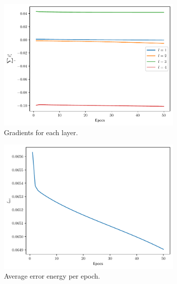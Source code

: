 \documentclass[conference]{IEEEtran}
\theoremstyle{definition}
\theoremstyle{remark}
\theoremstyle{remark}
\begin{document}
\begin{figure}
    \centering
    \begin{subfigure}[b]{0.32\textwidth}
        \centering
        \includegraphics[width=\textwidth]{figs/2-3-3-0.9-emb-gradients.pdf}
        \caption{Gradients for each layer.}
    \end{subfigure}
    \begin{subfigure}[b]{0.32\textwidth}
        \centering
        \includegraphics[width=\textwidth]{figs/2-3-3-0.9-emb-error.pdf}
        \caption{Average error energy per epoch.}
    \end{subfigure}
    \begin{subfigure}[b]{0.32\textwidth}
        \centering

\end{subfigure}
\end{figure}
\end{document}
